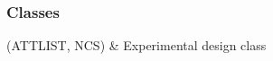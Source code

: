 \documentclass[a4paper,10pt,english]{sphinxhowto}
\begin{document}
\subsubsection*{Classes}


\begin{savenotes}\sphinxattablestart
\sphinxthistablewithglobalstyle
\sphinxthistablewithnovlinesstyle
\centering
\begin{tabulary}{\linewidth}[t]{}
\sphinxtoprule
\sphinxtableatstartofbodyhook
\sphinxAtStartPar
{\hyperref[\detokenize{generated/portchoice.design:portchoice.design.PortDesign}]{}}(ATTLIST, NCS)
&
\sphinxAtStartPar
Experimental design class
\\
\sphinxbottomrule
\end{tabulary}
\sphinxtableafterendhook\par
\sphinxattableend\end{savenotes}
\end{document}
